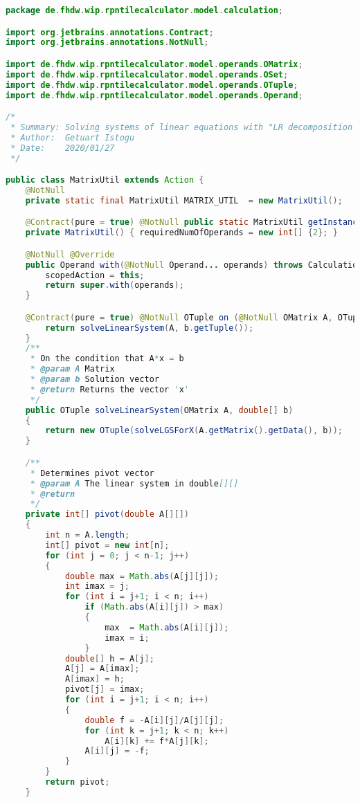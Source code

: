 \begin{lstlisting}[caption=MatrixUtil (Istogu),label=list:MatrixUtil,language=Java]
package de.fhdw.wip.rpntilecalculator.model.calculation;

import org.jetbrains.annotations.Contract;
import org.jetbrains.annotations.NotNull;

import de.fhdw.wip.rpntilecalculator.model.operands.OMatrix;
import de.fhdw.wip.rpntilecalculator.model.operands.OSet;
import de.fhdw.wip.rpntilecalculator.model.operands.OTuple;
import de.fhdw.wip.rpntilecalculator.model.operands.Operand;

/*
 * Summary: Solving systems of linear equations with "LR decomposition with column pivot search"
 * Author:  Getuart Istogu
 * Date:    2020/01/27
 */

public class MatrixUtil extends Action {
    @NotNull
    private static final MatrixUtil MATRIX_UTIL  = new MatrixUtil();

    @Contract(pure = true) @NotNull public static MatrixUtil getInstance() { return MATRIX_UTIL; }
    private MatrixUtil() { requiredNumOfOperands = new int[] {2}; }

    @NotNull @Override
    public Operand with(@NotNull Operand... operands) throws CalculationException {
        scopedAction = this;
        return super.with(operands);
    }

    @Contract(pure = true) @NotNull OTuple on (@NotNull OMatrix A, OTuple b) {
        return solveLinearSystem(A, b.getTuple());
    }
    /**
     * On the condition that A*x = b
     * @param A Matrix
     * @param b Solution vector
     * @return Returns the vector 'x'
     */
    public OTuple solveLinearSystem(OMatrix A, double[] b)
    {
        return new OTuple(solveLGSForX(A.getMatrix().getData(), b));
    }

    /**
     * Determines pivot vector
     * @param A The linear system in double[][]
     * @return
     */
    private int[] pivot(double A[][])
    {
        int n = A.length;
        int[] pivot = new int[n];
        for (int j = 0; j < n-1; j++)
        {
            double max = Math.abs(A[j][j]);
            int imax = j;
            for (int i = j+1; i < n; i++)
                if (Math.abs(A[i][j]) > max)
                {
                    max  = Math.abs(A[i][j]);
                    imax = i;
                }
            double[] h = A[j];
            A[j] = A[imax];
            A[imax] = h;
            pivot[j] = imax;
            for (int i = j+1; i < n; i++)
            {
                double f = -A[i][j]/A[j][j];
                for (int k = j+1; k < n; k++)
                    A[i][k] += f*A[j][k];
                A[i][j] = -f;
            }
        }
        return pivot;
    }


\end{lstlisting}
